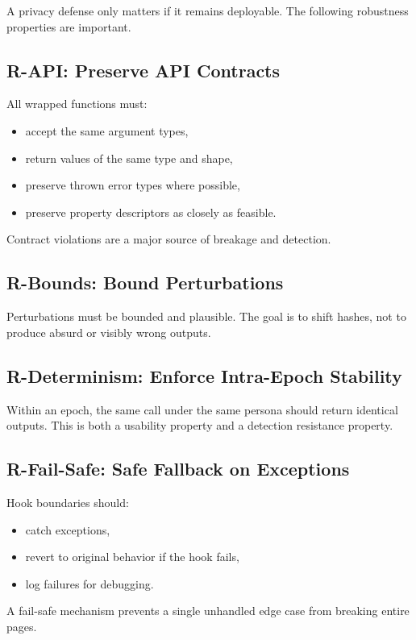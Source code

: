 \documentclass[11pt]{report}
\begin{document}
A privacy defense only matters if it remains deployable. The following robustness properties are important.

\subsection{R-API: Preserve API Contracts}

All wrapped functions must:
\begin{itemize}
    \item accept the same argument types,
    \item return values of the same type and shape,
    \item preserve thrown error types where possible,
    \item preserve property descriptors as closely as feasible.
\end{itemize}

Contract violations are a major source of breakage and detection.

\subsection{R-Bounds: Bound Perturbations}

Perturbations must be bounded and plausible. The goal is to shift hashes, not to produce absurd or visibly wrong outputs.

\subsection{R-Determinism: Enforce Intra-Epoch Stability}

Within an epoch, the same call under the same persona should return identical outputs. This is both a usability property and a detection resistance property.

\subsection{R-Fail-Safe: Safe Fallback on Exceptions}

Hook boundaries should:
\begin{itemize}
    \item catch exceptions,
    \item revert to original behavior if the hook fails,
    \item log failures for debugging.
\end{itemize}

A fail-safe mechanism prevents a single unhandled edge case from breaking entire pages.
\end{document}
